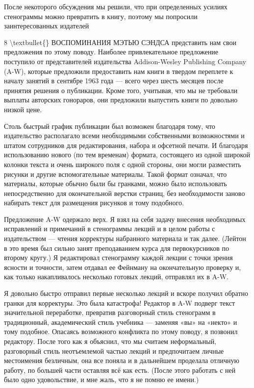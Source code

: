 \documentclass[10pt,oneside]{article}
\begin{document}
После некоторого обсуждения мы решили, что при определенных усилиях стенограммы можно превратить в книгу, поэтому мы попросили заинтересованных издателей\par

8 \textbackslash{}textbullet\{\} ВОСПОМИНАНИЯ МЭТЬЮ СЭНДСА представить нам свои предложения по этому поводу. Наиболее привлекательное предложение поступило от представителей издательства Addison-Wesley Publishing Company (A-W), которые предложили предоставить нам книги в твердом переплете к началу занятий в сентябре 1963 года --- всего через шесть месяцев после принятия решения о публикации. Кроме того, учитывая, что мы не требовали выплаты авторских гонораров, они предложили выпустить книги по довольно низкой цене.\par

Столь быстрый график публикации был возможен благодаря тому, что издательство располагало всеми необходимыми собственными возможностями и штатом сотрудников для редактирования, набора и офсетной печати. И благодаря использованию нового (по тем временам) формата, состоящего из одной широкой колонки текста и очень широкого поля с одной стороны, они могли разместить рисунки и другие вспомогательные материалы. Такой формат означал, что материалы, которые обычно были бы гранками, можно было использовать непосредственно для окончательной верстки страниц, без необходимости заново набирать текст для размещения рисунков и тому подобного.\par

Предложение A-W одержало верх. Я взял на себя задачу внесения необходимых исправлений и примечаний в стенограммы лекций и в целом работы с издательством --- чтения корректуры набранного материала и так далее. (Лейтон в это время был сильно занят преподаванием курса для первокурсников по второму кругу.) Я редактировал стенограмму каждой лекции с точки зрения ясности и точности, затем отдавал ее Фейнману на окончательную проверку и, как только накапливалось несколько готовых лекций, отправлял их в A-W.\par

Я довольно быстро отправил первые несколько лекций и вскоре получил обратно гранки для корректуры. Это была катастрофа! Редактор в A-W подверг текст значительной переработке, превратив разговорный стиль стенограмм в традиционный, академический стиль учебника --- заменяя «вы» на «некто» и тому подобное. Опасаясь возможного конфликта по этому поводу, я позвонил редактору. После того как я объяснил, что мы считаем неформальный, разговорный стиль неотъемлемой частью лекций и предпочитаем личные местоимения безличным, она все поняла и в дальнейшем проделала отличную работу, по большей части оставляя всё как есть. (После этого работать с ней было одно удовольствие, и мне жаль, что я не помню ее имени.)\par
\end{document}
